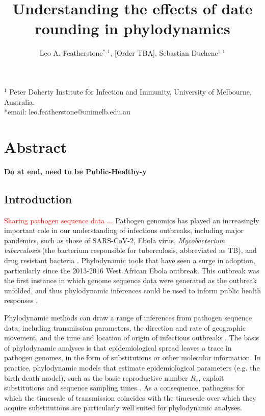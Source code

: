 \documentclass{article}
\title{Understanding the effects of date rounding in phylodynamics}
\author{Leo A. Featherstone$^{\ast,1}$, [Order TBA], Sebastian Duchene$^{\dagger,1}$}
\begin{document}
\maketitle
\linenumbers
$^{1}$ Peter Doherty Institute for Infection and Immunity, University of Melbourne, Australia.\\
*email: leo.featherstone@unimelb.edu.au

\section*{Abstract}
\textbf{Do at end, need to be Public-Healthy-y}

\begin{spacing}{1.5}
\section*{Introduction}
\textcolor{red}{Sharing pathogen sequence data ...}
Pathogen genomics has played an increasingly important role in our understanding of infectious outbreaks, including major pandemics, such as those of SARS-CoV-2, Ebola virus, \textit{Mycobacterium tuberculosis} (the bacterium responsible for tuberculosis, abbreviated as TB), and drug resistant bacteria \citep{lancet2021genomic}. Phylodynamic tools that have seen a surge in adoption, particularly since the 2013-2016 West African Ebola outbreak. This outbreak was the first instance in which genome sequence data were generated as the outbreak unfolded, and thus phylodynamic inferences could be used to inform public health responses \citep{mbala2019medical}.

Phylodynamic methods can draw a range of inferences from pathogen sequence data, including transmission parameters, the direction and rate of geographic movement, and the time and location of origin of infectious outbreaks \citep{featherstone2022epidemiological, attwood2022phylogenetic, du2015getting}. The basis of phylodynamic analyses is that epidemiological spread leaves a trace in pathogen genomes, in the form of substitutions or other molecular information. In practice, phylodynamic models that estimate epidemiological parameters (e.g. the birth-death model), such as the basic reproductive number $R_e$, exploit substitutions and sequence sampling times \citep{featherstone_decoding_2023}. As a consequence, pathogens for which the timescale of transmission coincides with the timescale over which they acquire substitutions are particularly well suited for phylodynamic analyses.


\end{spacing}
\end{document}
